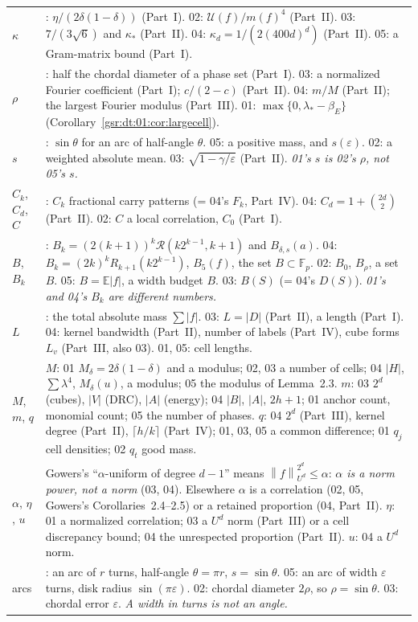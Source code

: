 \documentclass[11pt,letterpaper]{article}
\numberwithin{equation}{section}
\theoremstyle{definition}
\theoremstyle{remark}
\newcommand{\E}{\mathbb E}
\newcommand{\F}{\mathbb F}
\newcommand{\1}{\mathbf 1}
\newcommand{\norm}[1]{\left\|#1\right\|}
\newcommand{\U}{\mathcal U}
\begin{document}
\begin{longtable}{@{}>{\raggedright\arraybackslash}p{} >{\raggedright\arraybackslash}p{}@{}}
$\kappa$ & 01: $\eta/(2\delta(1-\delta))$ (Part~I). 02: $\U(f)/m(f)^4$ (Part~II). 03: $7/(3\sqrt6)$ and $\kappa_*$ (Part~II). 04: $\kappa_d=1/(2(400d)^d)$ (Part~II). 05: a Gram-matrix bound (Part~I).\\
$\rho$ & 02: half the chordal diameter of a phase set (Part~I). 03: a normalized Fourier coefficient (Part~I); $c/(2-c)$ (Part~II). 04: $m/M$ (Part~II); the largest Fourier modulus (Part~III). 01: $\max\{0,\lambda_*-\beta_E\}$ (Corollary~\ref{gsr:dt:01:cor:largecell}).\\
$s$ & 01: $\sin\theta$ for an arc of half-angle $\theta$. 05: a positive mass, and $s(\varepsilon)$. 02: a weighted absolute mean. 03: $\sqrt{1-\gamma/\varepsilon}$ (Part~II). \emph{01's $s$ is 02's $\rho$, not 05's $s$.}\\
$C_k$, $C_d$, $C$ & 01: $C_k$ fractional carry patterns (= 04's $F_k$, Part~IV). 04: $C_d=1+\binom{2d}2$ (Part~II). 02: $C$ a local correlation, $C_0$ (Part~I).\\
$B$, $B_k$ & 01: $B_k=(2(k+1))^k\mathcal R(k2^{k-1},k+1)$ and $B_{\delta,s}(a)$. 04: $B_k=(2k)^kR_{k+1}(k2^{k-1})$, $B_5(f)$, the set $B\subset\F_p$. 02: $B_0$, $B_\rho$, a set $B$. 05: $B=\E|f|$, a width budget $B$. 03: $B(S)$ (= 04's $D(S)$). \emph{01's and 04's $B_k$ are different numbers.}\\
$L$ & 02: the total absolute mass $\sum|f|$. 03: $L=|D|$ (Part~II), a length (Part~I). 04: kernel bandwidth (Part~II), number of labels (Part~IV), cube forms $L_v$ (Part~III, also 03). 01, 05: cell lengths.\\
$M$, $m$, $q$ & $M$: 01 $M_\delta=2\delta(1-\delta)$ and a modulus; 02, 03 a number of cells; 04 $|H|$, $\sum\lambda^4$, $M_\delta(u)$, a modulus; 05 the modulus of Lemma~2.3. $m$: 03 $2^d$ (cubes), $|V|$ (DRC), $|A|$ (energy); 04 $|B|$, $|A|$, $2h+1$; 01 anchor count, monomial count; 05 the number of phases. $q$: 04 $2^d$ (Part~III), kernel degree (Part~II), $\lceil h/k\rceil$ (Part~IV); 01, 03, 05 a common difference; 01 $q_j$ cell densities; 02 $q_t$ good mass.\\
$\alpha$, $\eta$, $u$ & Gowers's ``$\alpha$-uniform of degree $d-1$'' means $\norm f_{U^d}^{2^d}\le\alpha$: \emph{$\alpha$ is a norm power, not a norm} (03, 04). Elsewhere $\alpha$ is a correlation (02, 05, Gowers's Corollaries~2.4--2.5) or a retained proportion (04, Part~II). $\eta$: 01 a normalized correlation; 03 a $U^d$ norm (Part~III) or a cell discrepancy bound; 04 the unrespected proportion (Part~II). $u$: 04 a $U^d$ norm.\\
arcs & 01: an arc of $r$ turns, half-angle $\theta=\pi r$, $s=\sin\theta$. 05: an arc of width $\varepsilon$ turns, disk radius $\sin(\pi\varepsilon)$. 02: chordal diameter $2\rho$, so $\rho=\sin\theta$. 03: chordal error $\varepsilon$. \emph{A width in turns is not an angle.}\\

\end{longtable}
\end{document}
